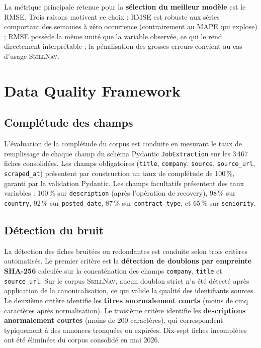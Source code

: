 \documentclass[11pt,a4paper,openany]{report}
\newcommand{\skillnav}{\textsc{SkillNav}\xspace}
\begin{document}
La m\'etrique principale retenue pour la \textbf{s\'election du meilleur mod\`ele} est le RMSE. Trois raisons motivent ce choix : RMSE est robuste aux s\'eries comportant des semaines \`a z\'ero occurrence (contrairement au MAPE qui explose) ; RMSE poss\`ede la m\^eme unit\'e que la variable observ\'ee, ce qui le rend directement interpr\'etable ; la p\'enalisation des grosses erreurs convient au cas d'usage \skillnav.

\section{Data Quality Framework}

\subsection{Compl\'etude des champs}

L'\'evaluation de la compl\'etude du corpus est conduite en mesurant le taux de remplissage de chaque champ du sch\'ema Pydantic \texttt{JobExtraction} sur les 3\,467 fiches consolid\'ees. Les champs obligatoires (\texttt{title}, \texttt{company}, \texttt{source}, \texttt{source\_url}, \texttt{scraped\_at}) pr\'esentent par construction un taux de compl\'etude de 100\,\%, garanti par la validation Pydantic. Les champs facultatifs pr\'esentent des taux variables : 100\,\% sur \texttt{description} (apr\`es l'op\'eration de recovery), 98\,\% sur \texttt{country}, 92\,\% sur \texttt{posted\_date}, 87\,\% sur \texttt{contract\_type}, et 65\,\% sur \texttt{seniority}.

\subsection{D\'etection du bruit}

La d\'etection des fiches bruit\'ees ou redondantes est conduite selon trois crit\`eres automatis\'es. Le premier crit\`ere est la \textbf{d\'etection de doublons par empreinte SHA-256} calcul\'ee sur la concat\'enation des champs \texttt{company}, \texttt{title} et \texttt{source\_url}. Sur le corpus \skillnav, aucun doublon strict n'a \'et\'e d\'etect\'e apr\`es application de la canonicalisation, ce qui valide la qualit\'e des identifiants sources. Le deuxi\`eme crit\`ere identifie les \textbf{titres anormalement courts} (moins de cinq caract\`eres apr\`es normalisation). Le troisi\`eme crit\`ere identifie les \textbf{descriptions anormalement courtes} (moins de 200 caract\`eres), qui correspondent typiquement \`a des annonces tronqu\'ees ou expir\'ees. Dix-sept fiches incompl\`etes ont \'et\'e \'elimin\'ees du corpus consolid\'e en mai 2026.
\end{document}
